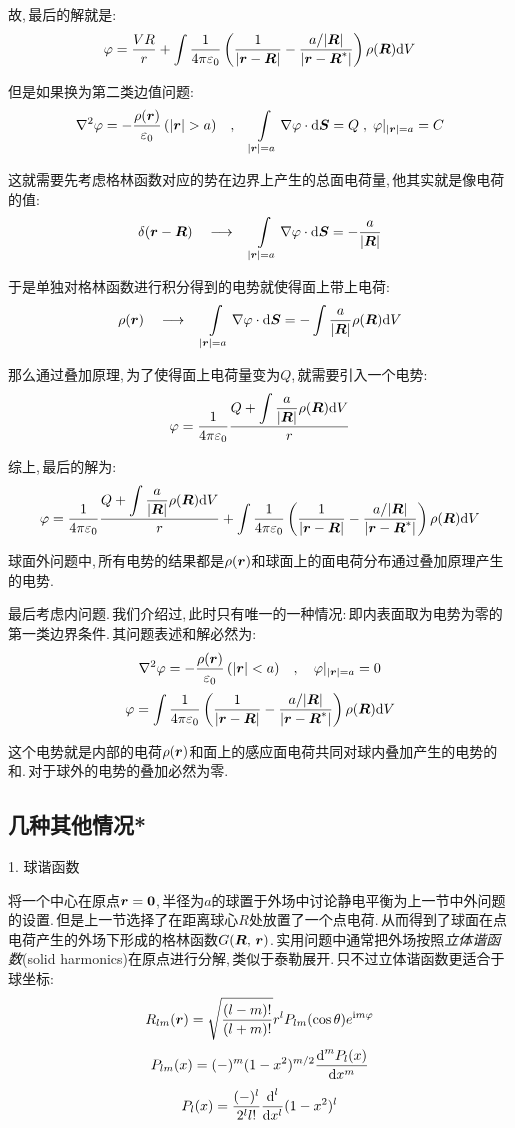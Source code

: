 故,\,最后的解就是:
\[\varphi=\frac{VR}{r}+\int \frac{1}{4\pi\varepsilon_0} \left(\frac{1}{|\boldsymbol{r}-\boldsymbol{R}|}-\frac{a/|\boldsymbol{R}|}{|\boldsymbol{r}-\boldsymbol{R}^\ast|}\right)\rho(\boldsymbol{R})\textrm{d} V\]

但是如果换为第二类边值问题:
\[\nabla^2\varphi = -\frac{\rho(\bs{r})}{\varepsilon_0}\,(|\bs{r}|>a)\quad ,\quad \int\limits_{|\bs{r}|=a}\nabla\varphi\cdot \ud \bs{S}=Q\;,\;\varphi|_{|\bs{r}|=a}=C\]

这就需要先考虑格林函数对应的势在边界上产生的总面电荷量,\,他其实就是像电荷的值:
\[\delta(\boldsymbol{r}-\boldsymbol{R})\quad \longrightarrow\quad  \int\limits_{|\boldsymbol{r}|=a}\nabla\varphi\cdot \textrm{d} \boldsymbol{S}=-\frac{a}{|\boldsymbol{R}|}\]

于是单独对格林函数进行积分得到的电势就使得面上带上电荷:
\[\rho(\boldsymbol{r})\quad \longrightarrow\quad \int\limits_{|\boldsymbol{r}|=a}\nabla\varphi\cdot \textrm{d} \boldsymbol{S}=-\int \frac{a}{|\boldsymbol{R}|}\rho(\boldsymbol{R})\textrm{d} V\]

那么通过叠加原理,\,为了使得面上电荷量变为$Q$,\,就需要引入一个电势:
\[\varphi=\frac{1}{4\pi\varepsilon_0} \frac{Q+\displaystyle\int \frac{a}{|\boldsymbol{R}|}\rho(\boldsymbol{R})\textrm{d} V}{r}\]

综上,\,最后的解为:
\[\varphi =\frac{1}{4\pi\varepsilon_0} \frac{Q+\displaystyle\int \frac{a}{|\boldsymbol{R}|}\rho(\boldsymbol{R})\textrm{d} V}{r}+\int \frac{1}{4\pi\varepsilon_0} \left(\frac{1}{|\boldsymbol{r}-\boldsymbol{R}|}-\frac{a/|\boldsymbol{R}|}{|\boldsymbol{r}-\boldsymbol{R}^\ast|}\right)\rho(\boldsymbol{R})\textrm{d} V \]

球面外问题中,\,所有电势的结果都是$\rho(\boldsymbol{r})$和球面上的面电荷分布通过叠加原理产生的电势.

最后考虑内问题.\,我们介绍过,\,此时只有唯一的一种情况:\,即内表面取为电势为零的第一类边界条件.\,其问题表述和解必然为:
\[\nabla^2\varphi = -\frac{\rho(\boldsymbol{r})}{\varepsilon_0}\,(|\boldsymbol{r}|<a)\quad ,\quad \varphi|_{|\boldsymbol{r}|=a}=0\]
\[\varphi=\int \frac{1}{4\pi\varepsilon_0} \left(\frac{1}{|\boldsymbol{r}-\boldsymbol{R}|}-\frac{a/|\boldsymbol{R}|}{|\boldsymbol{r}-\boldsymbol{R}^\ast|}\right)\rho(\boldsymbol{R})\textrm{d} V\]

这个电势就是内部的电荷$\rho(\boldsymbol{r})$和面上的感应面电荷共同对球内叠加产生的电势的和.\,对于球外的电势的叠加必然为零.

\subsection{几种其他情况*}

\vspace{0.2cm}
1. 球谐函数
\vspace{0.2cm}

将一个中心在原点$\boldsymbol{r}=\boldsymbol{0}$,\,半径为$a$的球置于外场中讨论静电平衡为上一节中外问题的设置.\,但是上一节选择了在距离球心$R$处放置了一个点电荷.\,从而得到了球面在点电荷产生的外场下形成的格林函数$G(\boldsymbol{R},\,\boldsymbol{r})$.\,实用问题中通常把外场按照\emph{立体谐函数}(solid harmonics)在原点进行分解,\,类似于泰勒展开.\,只不过立体谐函数更适合于球坐标:
\[R_{lm}(\boldsymbol{r})=\sqrt{\frac{(l-m)!}{(l+m)!}}r^lP_{lm}(\cos\theta)e^{{\rm i} m\varphi}\]
\[P_{lm}(x)=(-)^m(1-x^2)^{m/2}\frac{\textrm{d}^mP_l(x)}{\textrm{d} x^m}\]
\[P_l(x)=\frac{(-)^l}{2^ll!}\frac{\textrm{d}^l}{\textrm{d} x^l}(1-x^2)^l\]

